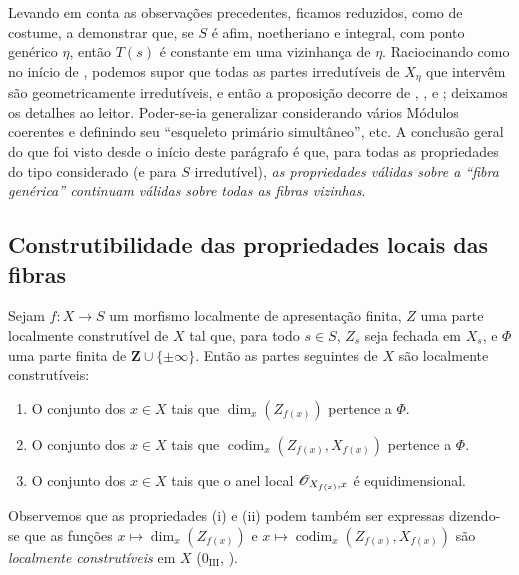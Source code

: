 \begin{remark}[9.8.9]
\medskip
Levando em conta as observações precedentes, ficamos reduzidos, como de costume, a demonstrar que, se $S$ é afim, noetheriano e integral, com ponto genérico $\eta$, então $T(s)$ é constante em uma vizinhança de $\eta$.
Raciocinando como no início de , podemos supor que todas as partes irredutíveis de $X_\eta$ que intervêm são geometricamente irredutíveis, e então a proposição decorre de , ,  e ; deixamos os detalhes ao leitor.
Poder-se-ia generalizar considerando vários Módulos coerentes e definindo seu ``esqueleto primário simultâneo'', etc.
A conclusão geral do que foi visto desde o início deste parágrafo é que, para todas as propriedades do tipo considerado (e para $S$ irredutível), \emph{as propriedades válidas sobre a ``fibra genérica'' continuam válidas sobre todas as fibras vizinhas}.
\end{remark}

\subsection{Construtibilidade das propriedades locais das fibras}
\label{subsection:IV.9.9}
\label{IV.9.9}

\begin{proposition}[9.9.1]
\label{IV.9.9.1}
Sejam $f:X\to S$ um morfismo localmente de apresentação finita, $Z$ uma parte localmente construtível de $X$ tal que, para todo $s\in S$, $Z_s$ seja fechada em $X_s$, e $\Phi$ uma parte finita de $\mathbf{Z}\cup\{\pm\infty\}$.
Então as partes seguintes de $X$ são localmente construtíveis:
\begin{enumerate}[label=(\roman*)]
  \item O conjunto dos $x\in X$ tais que $\dim_x(Z_{f(x)})$ pertence a $\Phi$.
  \item O conjunto dos $x\in X$ tais que $\operatorname{codim}_x(Z_{f(x)},X_{f(x)})$ pertence a $\Phi$.
  \item O conjunto dos $x\in X$ tais que o anel local $\mathscr{O}_{X_{f(x)},x}$ é equidimensional.
\end{enumerate}
\end{proposition}

Observemos que as propriedades (i) e (ii) podem também ser expressas dizendo-se que as funções $x\mapsto\dim_x(Z_{f(x)})$ e $x\mapsto\operatorname{codim}_x(Z_{f(x)},X_{f(x)})$ são \emph{localmente construtíveis} em $X$ ($0_{\mathrm{III}}$, ).

